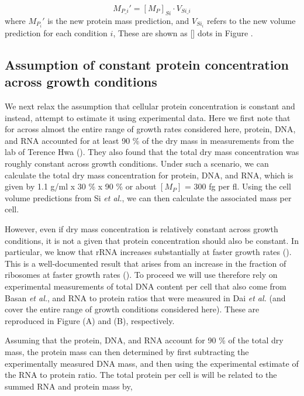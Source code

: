 \begin{equation}
	M_{P\_i}' = [M_P]_{Si} \cdot V_{Si\_i}
\end{equation}
where $M_{P_i}'$ is the new protein mass prediction, and $V_{Si_i}$ refers to
the new volume prediction for each condition $i$, These are shown as [] dots in
Figure .


\subsection{Assumption of constant protein concentration across growth conditions}

We next relax the assumption that cellular protein concentration is constant and
instead, attempt to  estimate it using experimental data. Here we first note
that  for across almost the entire range of growth rates considered here,
protein, DNA, and RNA accounted for at least 90 \% of the dry mass in
measurements from the lab of Terence Hwa (\cite{basan2015}). They also found that
the total dry mass concentration was roughly constant across growth conditions.
Under such a scenario, we can calculate the total dry mass concentration for
protein, DNA, and RNA, which is given by 1.1 g/ml x 30 \% x 90 \% or about
$[M_P]$ = 300 fg per fl. Using the cell volume predictions from Si \textit{et
al.}, we can then calculate the associated mass per cell.

However, even if dry mass concentration is relatively constant across growth
conditions, it is not a given that protein concentration should also be
constant. In particular, we know that rRNA increases substantially at faster
growth rates (\cite{dai2016}). This is a well-documented result that arises from
an increase in the fraction of ribosomes at faster growth rates
(\cite{scott2010}). To proceed we will use therefore rely on experimental
measurements of total DNA content per cell that also come from Basan \textit{et
al.}, and RNA to protein ratios that were measured in Dai \textit{et al.} (and
cover the entire range of growth conditions considered here). These are
reproduced in Figure (A) and (B),
respectively.

Assuming that the protein, DNA, and RNA account for 90 \% of the total dry mass,
the protein mass can then determined by first subtracting the experimentally
measured DNA mass,  and then using the experimental estimate of the RNA to
protein ratio. The total protein per cell is will be related to the summed RNA
and protein mass by,

